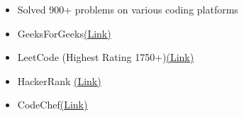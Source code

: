 \begin{itemize}
    \item  Solved 900+ problems on various coding platforms
    \item GeeksForGeeks\href{https://auth.geeksforgeeks.org/user/codebeans/practice/}{\hspace{0.1cm}(Link) }
    \item LeetCode (Highest Rating 1750+)\href{https://leetcode.com/sk811586/}{\hspace{0.1cm}(Link)}
    \item HackerRank  \href{https://www.hackerrank.com/sk811586}{\hspace{0.1cm}(Link)}
    \item CodeChef\href{https://www.codechef.com/users/sk811586}{\hspace{0.1cm}(Link)}
\end{itemize}










   



